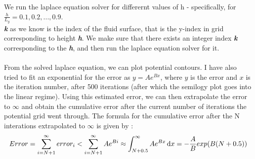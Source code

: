 \documentclass[11pt, a4paper]{article}
\begin{document}
We run the laplace equation solver for differernt values of h - specifically, for $\frac{h}{L_y} = 0.1,0.2,...,0.9$.
\\
\textit{\textbf{k}} as we know is the index of the fluid surface, that is the y-index in grid corresponding to height \textit{\textbf{h}}.
We make sure that there exists an integer index \textit{\textbf{k}} corresponding to the \textit{\textbf{h}}, and then run the laplace equation solver for it.
\\ \\
From the solved laplace equation, we can plot potential contours. I have also tried to fit an exponential for the error as $y = Ae^{Bx}$,
where $y$ is the error and $x$ is the iteration number, after 500 iterations (after which the semilogy plot goes into the linear regime).
Using this estimated error, we can then extrapolate the error to $\infty$ and obtain the cumulative error after the current number of iterations the potential grid went through.
The formula for the cumulative error after the N interations extrapolated to $\infty$ is given by :
\[
  Error = \sum_{i=N+1}^{\infty} error_i
  \\
    < \sum_{i=N+1}^{\infty} Ae^{Bi}
  \\
    \approx \int_{N+0.5}^{\infty} Ae^{Bx} \,\mathrm{d}x 
  \\
    = -\frac{A}{B}exp(B(N+0.5))
\]
\end{document}
